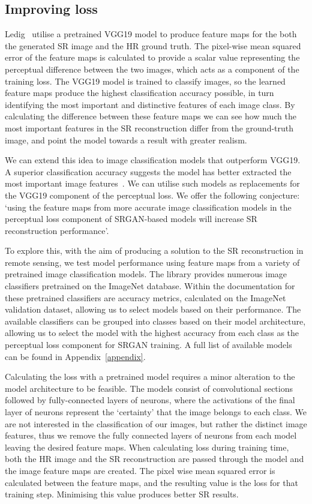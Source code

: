 \subsection{Improving loss}\label{subsec:improving_loss}
Ledig \etal \ utilise a pretrained VGG19 model to produce feature maps for the both the generated SR image and the HR ground truth. The pixel-wise mean squared error of the feature maps is calculated to provide a scalar value representing the perceptual difference between the two images, which acts as a component of the training loss. The VGG19 model is trained to classify images, so the learned feature maps produce the highest classification accuracy possible, in turn identifying the most important and distinctive features of each image class. By calculating the difference between these feature maps we can see how much the most important features in the SR reconstruction differ from the ground-truth image, and point the model towards a result with greater realism.

We can extend this idea to image classification models that outperform VGG19. A superior classification accuracy suggests the model has better extracted the most important image features~\cite{featureExtraction}. We can utilise such models as replacements for the VGG19 component of the perceptual loss. We offer the following conjecture: `using the feature maps from more accurate image classification models in the perceptual loss component of SRGAN-based models will increase SR reconstruction performance'.

To explore this, with the aim of producing a solution to the SR reconstruction in remote sensing, we  test model performance using feature maps from a variety of pretrained image classification models. The  library provides numerous image classifiers pretrained on the ImageNet database. Within the documentation for these pretrained classifiers are accuracy metrics, calculated on the ImageNet validation dataset, allowing us to select models based on their performance. The available classifiers can be grouped into classes based on their model architecture, allowing us to select the model with the highest accuracy from each class as the perceptual loss component for SRGAN training. A full list of available models can be found in Appendix~\ref{appendix}.

Calculating the loss with a pretrained model requires a minor alteration to the model architecture to be feasible. The models consist of convolutional sections followed by fully-connected layers of neurons, where the activations of the final layer of neurons represent the `certainty' that the image belongs to each class. We are not interested in the classification of our images, but rather the distinct image features, thus we remove the fully connected layers of neurons from each model leaving the desired feature maps. When calculating loss during training time, both the HR image and the SR reconstruction are passed through the model and the image feature maps are created. The pixel wise mean squared error is calculated between the feature maps, and the resulting value is the loss for that training step. Minimising this value produces better SR results.

